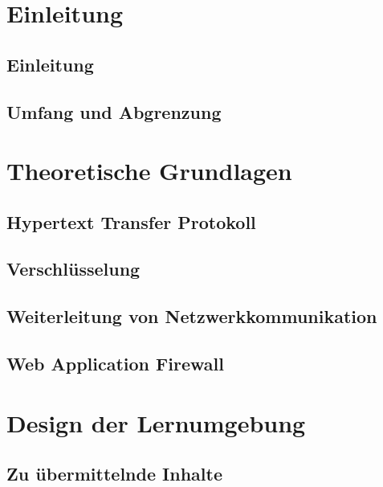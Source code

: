 \documentclass[a4paper, 12pt]{article}
\begin{document}
    
    
    

    \section{Einleitung}
    \subsection{Einleitung}
    
    \subsection{Umfang und Abgrenzung}
    
    \pagebreak

    \section{Theoretische Grundlagen}
    \subsection{Hypertext Transfer Protokoll}
    
    \subsection{Verschlüsselung}
    
    \subsection{Weiterleitung von Netzwerkkommunikation}
    
    \subsection{Web Application Firewall}
    
    \pagebreak

    \section{Design der Lernumgebung}
    \subsection{Zu übermittelnde Inhalte}
    \label{sec:inhalte}
    
\end{document}
